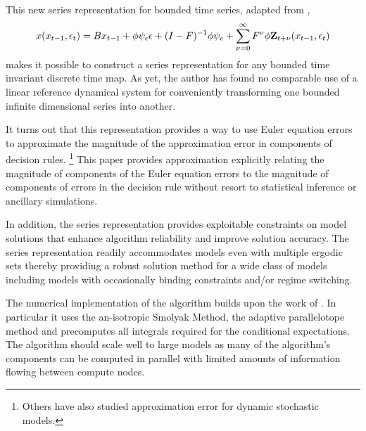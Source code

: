 \documentclass[12pt]{article}
\begin{document}
This new series representation for bounded time series, adapted from \citep{anderson10},
\begin{gather*}
      	 x\tArg =B x_{t-1}+ \phi \psi_\epsilon\epsilon + (I - F)^{-1} \phi \psi_c + \sum_{\sForSum=0}^\infty F^\sForSum \phi \ZWOarg_{t+\nu}\tArg%
    \end{gather*}
 makes it possible to  construct a series
    representation for any bounded time invariant discrete time map. As yet, the author has found no comparable use of a
linear reference dynamical system for  conveniently transforming
one bounded infinite dimensional series into another.


    It turns out that this representation provides a way to use
    Euler equation errors to
    approximate the magnitude of the    approximation error in components of 
    decision rules.
\footnote{    Others have also studied approximation error for dynamic stochastic models\cite{judd2017lower,santos2005accuracy,Santos2000accuracy}.} This paper provides  approximation
    explicitly relating the magnitude of components of the
    Euler equation errors to the magnitude of components of
    errors in the decision rule 
without resort to statistical inference or ancillary simulations.

    In addition, the series representation provides exploitable
    constraints on model solutions that enhance  
    algorithm reliability and improve solution accuracy.
    The series representation readily accommodates models even with
    multiple ergodic sets
    thereby providing a robust solution method for a wide class of models including models with occasionally binding constraints and/or regime switching.


The numerical implementation of the algorithm 
builds upon the work of
\citep{juddGSSA2011,JuddIntegrals}.
In particular it uses
the an-isotropic Smolyak Method, the adaptive
parallelotope method\citep{Judd2014}
and precomputes all integrals required for the conditional expectations.
The algorithm should scale well to large models as many 
of the algorithm's components can be computed in parallel with limited amounts of information flowing between compute nodes.
\end{document}
